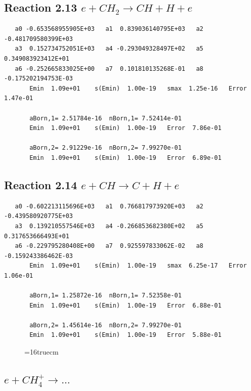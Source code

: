 \documentclass[12pt,dvipdfmx]{article}
\begin{document}
\subsection{
Reaction 2.13     $e + CH_2 \rightarrow CH + H + e $
}

\begin{small}\begin{verbatim}
   a0 -0.653568955905E+03   a1  0.839036140795E+03   a2 -0.481709580399E+03
   a3  0.152734752051E+03   a4 -0.293049328497E+02   a5  0.349083923412E+01
   a6 -0.252665833025E+00   a7  0.101810135268E-01   a8 -0.175202194753E-03
       Emin  1.09e+01    s(Emin)  1.00e-19   smax  1.25e-16   Error  1.47e-01

       aBorn,1= 2.51784e-16  nBorn,1= 7.52414e-01
       Emin  1.09e+01    s(Emin)  1.00e-19   Error  7.86e-01

       aBorn,2= 2.91229e-16  nBorn,2= 7.99270e-01
       Emin  1.09e+01    s(Emin)  1.00e-19   Error  6.89e-01
\end{verbatim}\end{small}

\subsection{
Reaction 2.14     $e + CH \rightarrow C + H + e $
}

\begin{small}\begin{verbatim}
   a0 -0.602213115696E+03   a1  0.766817973920E+03   a2 -0.439580920775E+03
   a3  0.139210557546E+03   a4 -0.266853682380E+02   a5  0.317653666493E+01
   a6 -0.229795280408E+00   a7  0.925597833062E-02   a8 -0.159243386462E-03
       Emin  1.09e+01    s(Emin)  1.00e-19   smax  6.25e-17   Error  1.06e-01

       aBorn,1= 1.25872e-16  nBorn,1= 7.52358e-01
       Emin  1.09e+01    s(Emin)  1.00e-19   Error  6.88e-01

       aBorn,2= 1.45614e-16  nBorn,2= 7.99270e-01
       Emin  1.09e+01    s(Emin)  1.00e-19   Error  5.88e-01
\end{verbatim}\end{small}

\begin{figure} \label{met.1_2.13}
\epsfxsize=16truecm
\end{figure}
\newpage

\subsection{
$e + CH_4^+ \rightarrow ... $
}
\end{document}

